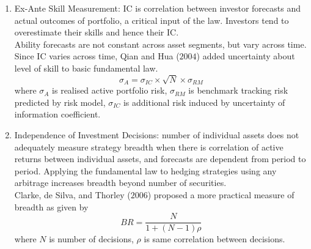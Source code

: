 \begin{remark} 
\begin{enumerate}[label=\roman*.]
\setlength{\itemsep}{0pt}
\item Ex-Ante Skill Measurement: IC is correlation between investor forecasts and actual outcomes of portfolio, a critical input of the law. Investors tend to overestimate their skills and hence their IC.\\
Ability forecasts are not constant across asset segments, but vary across time. Since IC varies across time, Qian and Hua ($2004$) added uncertainty about level of skill to basic fundamental law.
\begin{equation}
\sigma_A = \sigma_{IC} \times \sqrt{N} \times \sigma_{RM} \nonumber
\end{equation}
where $\sigma_A$ is realised active portfolio risk, $\sigma_{RM}$ is benchmark tracking risk predicted by risk model, $\sigma_{IC}$ is additional risk induced by uncertainty of information coefficient.
\item Independence of Investment Decisions: number of individual assets does not adequately measure strategy breadth when there is correlation of active returns between individual assets, and forecasts are dependent from period to period. Applying the fundamental law to hedging strategies using any arbitrage increases breadth beyond number of securities.\\
Clarke, de Silva, and Thorley ($2006$) proposed a more practical measure of breadth as given by
\begin{equation}
BR = \frac{N}{1 + (N-1) \rho} \nonumber
\end{equation}
where $N$ is number of decisions, $\rho$ is same correlation between decisions.
\end{enumerate}
\end{remark}
